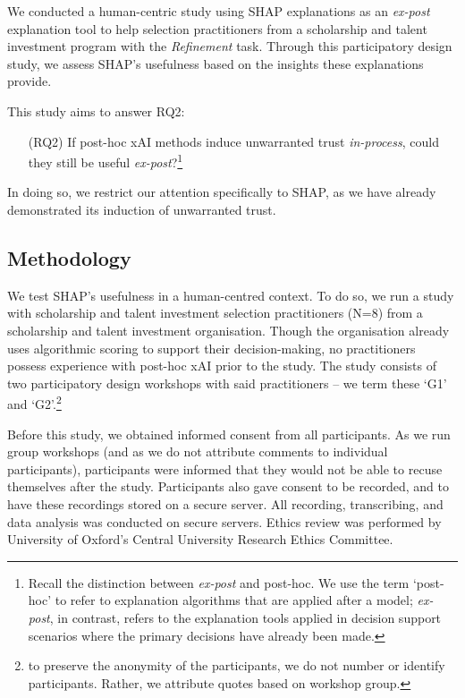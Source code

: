 We conducted a human-centric study using SHAP explanations as an \emph{ex-post} explanation tool to help selection practitioners from a scholarship and talent investment program with the \emph{Refinement} task. Through this participatory design study, we assess SHAP's usefulness based on the insights these explanations provide.

This study aims to answer RQ2:

\begin{enumerate}
    \item[(RQ2)] If post-hoc xAI methods induce unwarranted trust \emph{in-process}, could they still be useful \emph{ex-post}?\footnote{Recall the distinction between \emph{ex-post} and post-hoc. We use the term `post-hoc' to refer to explanation algorithms that are applied after a model; \emph{ex-post}, in contrast, refers to the explanation tools applied in decision support scenarios where the primary decisions have already been made.}
\end{enumerate}

\noindent In doing so, we restrict our attention specifically to SHAP, as we have already demonstrated its induction of unwarranted trust.

\subsection{Methodology}\label{ssec:cs_methods}
We test SHAP's usefulness in a human-centred context. To do so, we run a study with scholarship and talent investment selection practitioners (N=8) from a scholarship and talent investment organisation. Though the organisation already uses algorithmic scoring to support their decision-making, no practitioners possess experience with post-hoc xAI prior to the study. The study consists of two participatory design workshops with said practitioners – we term these `G1' and `G2'.\footnote{to preserve the anonymity of the participants, we do not number or identify participants. Rather, we attribute quotes based on workshop group.}

Before this study, we obtained informed consent from all participants. As we run group workshops (and as we do not attribute comments to individual participants), participants were informed that they would not be able to recuse themselves after the study. Participants also gave consent to be recorded, and to have these recordings stored on a secure server. All recording, transcribing, and data analysis was conducted on secure servers. Ethics review was performed by University of Oxford's Central University Research Ethics Committee.


